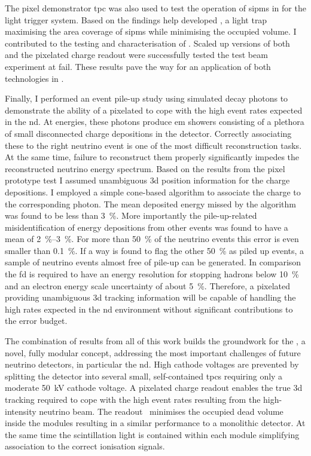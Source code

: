 The pixel demonstrator \gls{tpc} was also used to test the operation of \glspl{sipm} in \lar{} for the light trigger system.
Based on the findings \gls{help} developed \AL{}, a light trap maximising the area coverage of \glspl{sipm} while minimising the occupied volume.
I contributed to the testing and characterisation of \AL{}.
Scaled up versions of both \AL{} and the pixelated charge readout were successfully tested the \pixlar{} test beam experiment at \gls{fail}.
These results pave the way for an application of both technologies in \AC{}.

Finally, I performed an event pile-up study using simulated \Pgpz decay photons to demonstrate the ability of a pixelated \lartpc{} to cope with the high event rates expected in the \dune{} \gls{nd}.
At \dune{} energies, these photons produce \gls{em} showers consisting of a plethora of small disconnected charge depositions in the detector.
Correctly associating these to the right neutrino event is one of the most difficult reconstruction tasks.
At the same time, failure to reconstruct them properly significantly impedes the reconstructed neutrino energy spectrum.
Based on the results from the pixel prototype test I assumed unambiguous \gls{3d} position information for the charge depositions.
I employed a simple cone-based algorithm to associate the charge to the corresponding photon.
The mean deposited energy missed by the algorithm was found to be less than \SI{3}{\percent}.
More importantly the pile-up-related misidentification of energy depositions from other events was found to have a mean of \SIrange{2}{3}{\percent}.
For more than \SI{50}{\percent} of the neutrino events this error is even smaller than \SI{0.1}{\percent}.
If a way is found to flag the other \SI{50}{\percent} as piled up events, a sample of neutrino events almost free of pile-up can be generated.
In comparison the \gls{fd} is required to have an energy resolution for stopping hadrons below \SI{10}{\percent} and an electron energy scale uncertainty of about \SI{5}{\percent}.
Therefore, a pixelated \AC{} providing unambiguous \gls{3d} tracking information will be capable of handling the high rates expected in the \dune{} \gls{nd} environment without significant contributions to the error budget.

The combination of results from all of this work builds the groundwork for the \AC{}, a novel, fully modular \lartpc{} concept, addressing the most important challenges of future neutrino detectors, in particular the \dune{} \gls{nd}.
High cathode voltages are prevented by splitting the detector into several small, self-contained \glspl{tpc} requiring only a moderate \SI{50}{\kilo\volt} cathode voltage.
A pixelated charge readout enables the true \gls{3d} tracking required to cope with the high event rates resulting from the high-intensity neutrino beam.
The \AL{} readout~\cite{arclight} minimises the occupied dead volume inside the modules resulting in a similar performance to a monolithic detector.
At the same time the scintillation light is contained within each module simplifying association to the correct ionisation signals.

